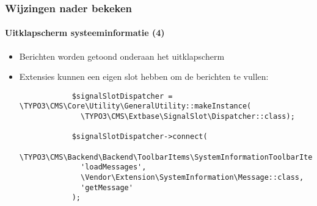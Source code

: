 \begin{frame}[fragile]
	\frametitle{Wijzingen nader bekeken}
	\framesubtitle{Uitklapscherm systeeminformatie (4)}

	\lstset{basicstyle=\tiny\ttfamily}

	\begin{itemize}

		\item Berichten worden getoond onderaan het uitklapscherm

		\item Extensies kunnen een eigen slot hebben om de berichten te vullen:

		\begin{lstlisting}
			$signalSlotDispatcher = \TYPO3\CMS\Core\Utility\GeneralUtility::makeInstance(
			  \TYPO3\CMS\Extbase\SignalSlot\Dispatcher::class);

			$signalSlotDispatcher->connect(
			  \TYPO3\CMS\Backend\Backend\ToolbarItems\SystemInformationToolbarItem::class,
			  'loadMessages',
			  \Vendor\Extension\SystemInformation\Message::class,
			  'getMessage'
			);
		\end{lstlisting}

	\end{itemize}

\end{frame}

